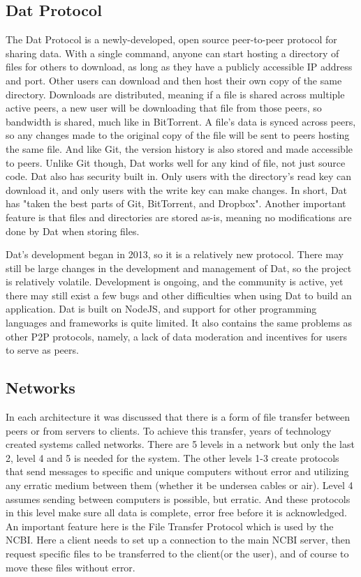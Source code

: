 \documentclass[acmsmall]{acmart}
\begin{document}
\begin{multicols}{2}
\subsection{Dat Protocol}

The Dat Protocol is a newly-developed, open source peer-to-peer protocol for sharing data\cite{dat}. With a single command, anyone can start hosting a directory of files for others to download, as long as they have a publicly accessible IP address and port. Other users can download and then host their own copy of the same directory. Downloads are distributed, meaning if a file is shared across multiple active peers, a new user will be downloading that file from those peers, so bandwidth is shared, much like in BitTorrent. A file's data is synced across peers, so any changes made to the original copy of the file will be sent to peers hosting the same file. And like Git, the version history is also stored and made accessible to peers. Unlike Git though, Dat works well for any kind of file, not just source code. Dat also has security built in. Only users with the directory's read key can download it, and only users with the write key can make changes. In short, Dat has "taken the best parts of Git, BitTorrent, and Dropbox"\cite{dat}. Another important feature is that files and directories are stored as-is, meaning no modifications are done by Dat when storing files.

Dat's development began in 2013, so it is a relatively new protocol. There may still be large changes in the development and management of Dat, so the project is relatively volatile. Development is ongoing, and the community is active, yet there may still exist a few bugs and other difficulties when using Dat to build an application. Dat is built on NodeJS, and support for other programming languages and frameworks is quite limited. It also contains the same problems as other P2P protocols, namely, a lack of data moderation and incentives for users to serve as peers.


\subsection{Networks}
In each architecture it was discussed that there is a form of file transfer between peers or from servers to clients. To achieve this transfer, years of technology created systems called networks. There are 5 levels in a network \cite{kurose} but only the last 2, level 4 and 5 is needed for the system. The other levels 1-3 create protocols that send messages to specific and unique computers without error and utilizing any erratic medium between them (whether it be undersea cables or air). 
Level 4 assumes sending between computers is possible, but erratic. And these protocols in this level make sure all data is complete, error free before it is acknowledged. An important feature here is the File Transfer Protocol which is used by the NCBI. Here a client needs to set up a connection to the main NCBI server, then request specific files to be transferred to the client(or the user), and of course to move these files without error.


\end{multicols}
\end{document}
